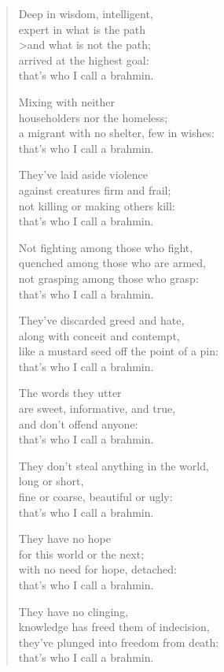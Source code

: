 \documentclass[12pt,openany]{book}%
\begin{document}
\begin{verse}
Deep in wisdom, intelligent, \\
expert in what is the path \\>and what is not the path; \\
arrived at the highest goal: \\
that’s who I call a brahmin. 

Mixing with neither \\
householders nor the homeless; \\
a migrant with no shelter, few in wishes: \\
that’s who I call a brahmin. 

They’ve laid aside violence \\
against creatures firm and frail; \\
not killing or making others kill: \\
that’s who I call a brahmin. 

Not fighting among those who fight, \\
quenched among those who are armed, \\
not grasping among those who grasp: \\
that’s who I call a brahmin. 

They’ve discarded greed and hate, \\
along with conceit and contempt, \\
like a mustard seed off the point of a pin: \\
that’s who I call a brahmin. 

The words they utter \\
are sweet, informative, and true, \\
and don’t offend anyone: \\
that’s who I call a brahmin. 

They don’t steal anything in the world, \\
long or short, \\
fine or coarse, beautiful or ugly: \\
that’s who I call a brahmin. 

They have no hope \\
for this world or the next; \\
with no need for hope, detached: \\
that’s who I call a brahmin. 

They have no clinging, \\
knowledge has freed them of indecision, \\
they’ve plunged into freedom from death: \\
that’s who I call a brahmin. 


\end{verse}
\end{document}
